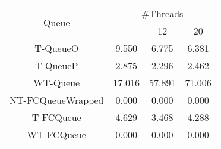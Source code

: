 \begin{tabular}{|c|c|c|c|}
\hline
\multirow{2}{*}{Queue} & \multicolumn{3}{c|}{\#Threads}\\\cline{2-4}& \quad 4 & 12 & 20\\
\hline
\hline
T-QueueO & 9.550 & 6.775 & 6.381\\
T-QueueP & 2.875 & 2.296 & 2.462\\
WT-Queue & 17.016 & 57.891 & 71.006\\
NT-FCQueueWrapped & 0.000 & 0.000 & 0.000\\
T-FCQueue & 4.629 & 3.468 & 4.288\\
WT-FCQueue & 0.000 & 0.000 & 0.000\\
\hline\end{tabular}
